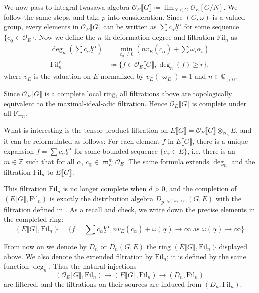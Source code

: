 \documentclass[11pt]{article}
\theoremstyle{definition}
\newcommand{\cO}{\mathcal O}
\begin{document}
We now pass to integral Iwasawa algebra $\cO_E\llbracket G\rrbracket\coloneqq\lim_{N<G}\cO_E[G/N]$. We follow the same steps, and take $p$ into consideration. 
Since $(G, \omega)$ is a valued group, every elements in $\cO_E\llbracket G\rrbracket$ can be written as $\sum c_{\underline\alpha}\underline b^{\underline{\alpha}}$ for some sequence $\{c_{\underline\alpha}\in \cO_E\}$.
Now we define the $n$-th deformation degree and filtration $\mathrm{Fil}_n$ as 
\[\begin{aligned}
      \deg_n(\sum c_{\underline\alpha}\underline b^{\underline{\alpha}})&=\min_{c_{\underline\alpha}\neq0}(nv_E(c_{\underline\alpha})+\sum\omega_i\alpha_i)\\
      \mathrm{Fil}_n^r&\coloneqq\{f\in\cO_E\llbracket G\rrbracket, \deg_n(f)\ge r\}.
\end{aligned}\]
where $v_E$ is the valuation on $E$ normalized by $v_E(\varpi_E)=1$ and $n\in\mathbb{Q}_{>0}$.

Since $\cO_E\llbracket G\rrbracket$ is a complete local ring, all filtrations above are topologically equivalent to the maximal-ideal-adic filtration. Hence $\cO_E\llbracket G\rrbracket$ is complete under all $\mathrm{Fil}_n$.

What is interesting is the tensor product filtration on $E\llbracket G\rrbracket=\cO_E\llbracket G\rrbracket\otimes_{\cO_E}E$, and it can be reformulated as follows:
For each element $f$ in $E\llbracket G\rrbracket$, there is a unique expansion $f=\sum c_{\underline\alpha}\underline b^{\underline{\alpha}}$ for some bounded sequence $\{c_{\underline{\alpha}}\in E\}$, i.e. there is an $m\in\mathbb{Z}$ such that for all $\underline{\alpha}$, $c_{\underline{\alpha}}\in\varpi_E^{m}\cO_E$. 
The same formula extends $\deg_n$ and the filtration
$\mathrm{Fil}_n$ to $E\llbracket G\rrbracket$.

This filtration $\mathrm{Fil}_n$ is no longer complete when $d>0$, and the completion of $(E\llbracket G\rrbracket, \mathrm{Fil}_n)$ is exactly the distribution algebra $D_{p^{-{v_p(\varpi_E)}/{n}}}(G, E)$ with the filtration defined in \cite{ST03}. 
As a recall and check, we write down the precise elements in the completed ring:
\[ (E\llbracket G\rrbracket, \mathrm{Fil}_n)\widehat{  }=\{f=\sum c_{\underline\alpha}\underline b^{\underline{\alpha}}, nv_E(c_{\underline{\alpha}})+\omega(\underline{\alpha})\to\infty\text{ as } \omega(\underline\alpha)\to\infty\}\]

From now on we denote by $D_{n}$ or $D_n(G, E)$ the ring $(E\llbracket G\rrbracket, \mathrm{Fil}_n)\widehat{  }$ displayed above.
We also denote the extended filtration by $\mathrm{Fil}_n$; it is defined by the same function $\deg_n$. Thus the natural injections 
\[(\cO_E\llbracket G\rrbracket, \mathrm{Fil}_n)\to(E\llbracket G\rrbracket, \mathrm{Fil}_n)\to (D_n, \mathrm{Fil}_n)\]
are filtered, and the filtrations on their sources are induced from $(D_n, \mathrm{Fil}_n)$.
\end{document}
